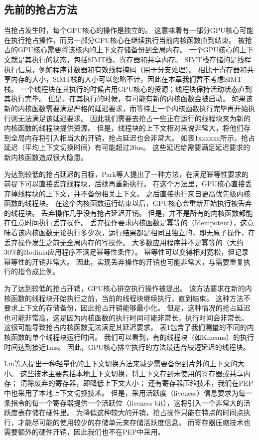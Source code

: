 \subsection{先前的抢占方法}

当抢占发生时，每个GPU核心的操作是独立的。
这意味着有一部分GPU核心可能在执行抢占操作，而另一部分GPU核心在继续执行当前内核函数直到结束。
被抢占的GPU核心需要将该核内的上下文存储备份到全局内存。
一个GPU核心的上下文就是其执行的状态，包括SIMT栈、寄存器和共享内存。
SIMT栈存储的是线程执行信息，例如程序计数器和有效线程掩码（用于分支处理）。
相比于寄存器和共享内存的大小，SIMT栈的大小可以忽略不计，因此在本章我们暂不考虑SIMT栈。
一个线程块在其执行的时候占用GPU核心的资源；线程块保持活动状态直到其执行完毕。
但是，在其执行的时候，有可能有新的内核函数会被启动。
如果该新的内核函数需要满足严格的延迟要求，而等待上一个内核函数执行完毕再开始执行则无法满足该延迟要求。
因此我们需要去抢占一些正在运行的线程块来为新的内核函数的线程块提供资源。
但是，线程块的上下文相对来说非常大，将他们存到全局内存将引入相当大的开销，抢占延迟也会非常大。
如表1xxxxxx所示，抢占延迟（平均上下文切换时间）有可能超过20us。
这些延迟给需要满足延迟要求的新内核函数造成很大隐患。

为达到较低的抢占延迟的目标，Park等人提出了一种方法，在满足幂等性要求的前提下可以直接丢弃线程块，后续再重新执行。
在这个方法里，GPU核心直接丢弃掉线程块的上下文，并不备份相关上下文。
之后直接执行来自更高优先级内核函数的线程块。
在这个内核函数运行结束以后，GPU核心会重新开始执行被丢弃的线程块。
丢弃操作几乎没有抢占延迟开销。
但是，并不是所有的内核函数都能在任意时间执行丢弃操作。
丢弃操作要求内核函数是幂等的（Idempotent），这意味着该内核函数无论执行多少次，运行结果都是相同且独立的，即无原子操作，在丢弃操作发生之前无全局内存的写操作。
大多数应用程序并不是幂等的（大约30\%的Rodinia应用程序不满足幂等性条件）。
幂等性可以变得相对宽松，但记录幂等性的开销非常大。
因此，实现丢弃操作的开销也可能非常大，与需要重复执行的指令成比例。

为了达到较低的抢占开销，GPU核心排空执行操作被提出。
该方法要求在新的内核函数的线程块开始执行之前，当前的线程块继续执行，直到结束。
这种方法不要求上下文的存储备份，因此抢占开销能够最小化。
但是，这种情况的抢占延迟也可能非常高，这是因为内核函数的执行时间可能非常长，执行时间会非常长。
这很可能导致抢占内核函数无法满足其延迟要求。
表1包含了我们测量的不同的内核函数的单个线程块运行时间。
我们可以看到，有的线程块（如Kmeans）的执行时间达到接近1ms。
因此，GPU核心排空执行的方法最适合较短延迟的线程块。

Lin等人提出一种轻量化的上下文切换方法来减少需要备份到片外的上下文的大小。
这些技术主要包括本地上下文切换，将上下文存到未使用的寄存器或共享内存；
清除废弃的寄存器，即降低上下文大小；
还有寄存器压缩技术，我们在PEP中也采用了本地上下文切换技术。
但是，采用活跃度（liveness）信息要求为每一条指令的每一个寄存器提供一个活跃位（liveness bit），这将引入一个非常大的活跃度表存储在硬件里。
为降低这种较大的开销，抢占操作只能在特点的时间点执行，才能尽可能的使用较少的存储单元来存储活跃度信息。
而寄存器压缩技术也需要额外的硬件开销，因此我们也不在PEP中采用。


